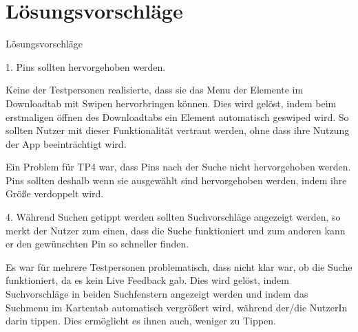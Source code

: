 \section{Lösungsvorschläge}

Lösungsvorschläge

1. Pins sollten hervorgehoben werden.

Keine der Testpersonen realisierte, dass sie das Menu der Elemente im Downloadtab mit Swipen hervorbringen können. Dies wird gelöst, indem beim erstmaligen öffnen des Downloadtabs ein Element automatisch geswiped wird. So sollten Nutzer mit dieser Funktionalität vertraut werden, ohne dass ihre Nutzung der App beeinträchtigt wird.


Ein Problem für TP4 war, dass Pins nach der Suche nicht hervorgehoben werden. Pins sollten deshalb wenn sie ausgewählt sind hervorgehoben werden, indem ihre Größe verdoppelt wird.

4. Während Suchen getippt werden sollten Suchvorschläge angezeigt werden, so merkt der Nutzer zum einen, dass die Suche funktioniert und zum anderen kann er den gewünschten Pin so schneller finden.

Es war für mehrere Testpersonen problematisch, dass nicht klar war, ob die Suche funktioniert, da es kein Live Feedback gab. Dies wird gelöst, indem Suchvorschläge in beiden Suchfenstern angezeigt werden und indem das Suchmenu im Kartentab automatisch vergrößert wird, während der/die NutzerIn darin tippen. Dies ermöglicht es ihnen auch, weniger zu Tippen.
